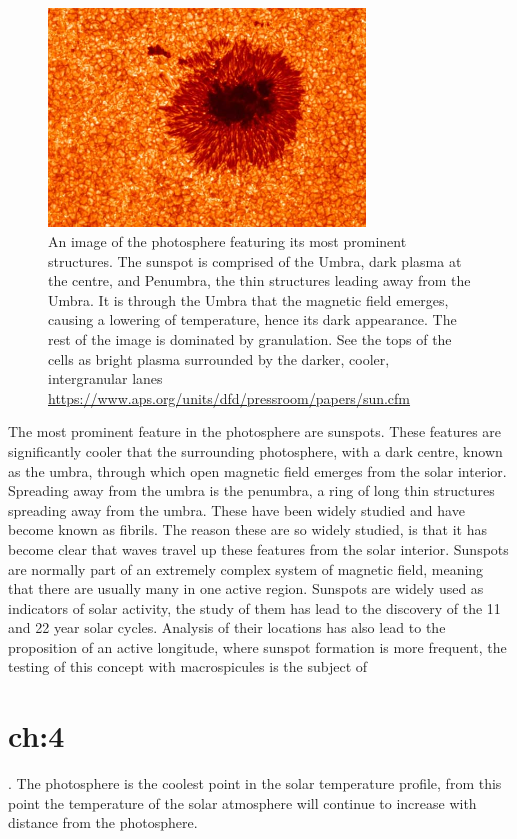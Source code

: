\begin{figure}
	\centering
	\includegraphics[width=0.75\textwidth]{Chapter1/Figs/granulation_and_sunspot}
	\caption{An image of the photosphere featuring its most prominent structures. The sunspot is comprised of the Umbra, dark plasma at the centre, and Penumbra, the thin structures leading away from the Umbra. It is through the Umbra that the magnetic field emerges, causing a lowering of temperature, hence its dark appearance.
	The rest of the image is dominated by granulation. See the tops of the cells as bright plasma surrounded by the darker, cooler, intergranular lanes
		\url{https://www.aps.org/units/dfd/pressroom/papers/sun.cfm}}
	\label{fig:granssp}
\end{figure}

The most prominent feature in the photosphere are sunspots.
These features are significantly cooler that the surrounding photosphere, with a dark centre, known as the umbra, through which open magnetic field emerges from the solar interior.
Spreading away from the umbra is the penumbra, a ring of long thin structures spreading away from the umbra.
These have been widely studied and have become known as fibrils.
The reason these are so widely studied, is that it has become clear that waves travel up these features from the solar interior.
Sunspots are normally part of an extremely complex system of magnetic field, meaning that there are usually many in one active region.
Sunspots are widely used as indicators of solar activity, the study of them has lead to the discovery of the 11 and 22 year solar cycles.
Analysis of their locations has also lead to the proposition of an active longitude, where sunspot formation is more frequent, the testing of this concept with macrospicules is the subject of \chapter{ch:4}.
The photosphere is the coolest point in the solar temperature profile, from this point the temperature of the solar atmosphere will continue to increase with distance from the photosphere.

